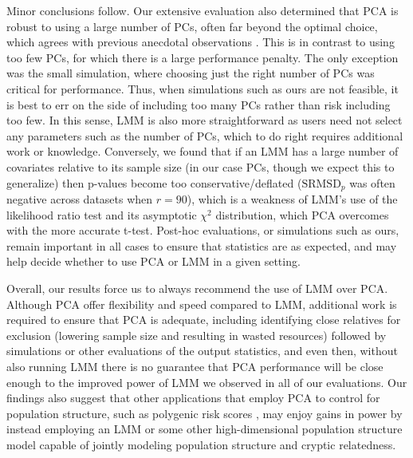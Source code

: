 \documentclass[11pt]{article}
\newcommand{\rmsd}{\text{SRMSD}_p}
\begin{document}
Minor conclusions follow.
Our extensive evaluation also determined that PCA is robust to using a large number of PCs, often far beyond the optimal choice, which agrees with previous anecdotal observations \citep{price_principal_2006, kang_variance_2010}.
This is in contrast to using too few PCs, for which there is a large performance penalty.
The only exception was the small simulation, where choosing just the right number of PCs was critical for performance.
Thus, when simulations such as ours are not feasible, it is best to err on the side of including too many PCs rather than risk including too few.
In this sense, LMM is also more straightforward as users need not select any parameters such as the number of PCs, which to do right requires additional work or knowledge.
Conversely, we found that if an LMM has a large number of covariates relative to its sample size (in our case PCs, though we expect this to generalize) then p-values become too conservative/deflated ($\rmsd$ was often negative across datasets when $r=90$), which is a weakness of LMM's use of the likelihood ratio test and its asymptotic $\chi^2$ distribution, which PCA overcomes with the more accurate t-test.
Post-hoc evaluations, or simulations such as ours, remain important in all cases to ensure that statistics are as expected, and may help decide whether to use PCA or LMM in a given setting.

Overall, our results force us to always recommend the use of LMM over PCA.
Although PCA offer flexibility and speed compared to LMM, additional work is required to ensure that PCA is adequate, including identifying close relatives for exclusion (lowering sample size and resulting in wasted resources) followed by simulations or other evaluations of the output statistics, and even then, without also running LMM there is no guarantee that PCA performance will be close enough to the improved power of LMM we observed in all of our evaluations.
Our findings also suggest that other applications that employ PCA to control for population structure, such as polygenic risk scores \citep{qian_fast_2020}, may enjoy gains in power by instead employing an LMM or some other high-dimensional population structure model capable of jointly modeling population structure and cryptic relatedness.

\end{document}
